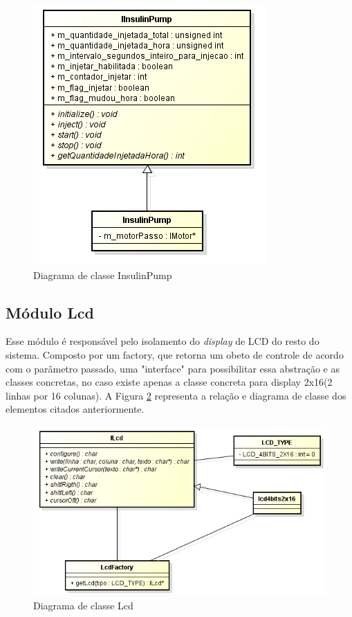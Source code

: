 \begin{figure}[htp]
	\centering
	\includegraphics[scale=1]{images/classe_insulinpump.png}
	\caption{Diagrama de classe InsulinPump}	
	\label{fig:diagramainsulinpump}
\end{figure}

\subsection{Módulo Lcd}

Esse módulo é responsável pelo isolamento do \emph{display} de LCD do resto do sistema. Composto por um factory, que retorna um obeto de controle de acordo com o parâmetro passado, uma "interface" para possibilitar essa abstração e as classes concretas, no caso existe apenas a classe concreta para display 2x16(2 linhas por 16 colunas). A Figura \ref{fig:diagramalcd} representa a relação e diagrama de classe dos elementos citados anteriormente.

\begin{figure}[htp]
	\centering
	\includegraphics[scale=0.8]{images/classe_lcd.png}
	\caption{Diagrama de classe Lcd}	
	\label{fig:diagramalcd}
\end{figure}

